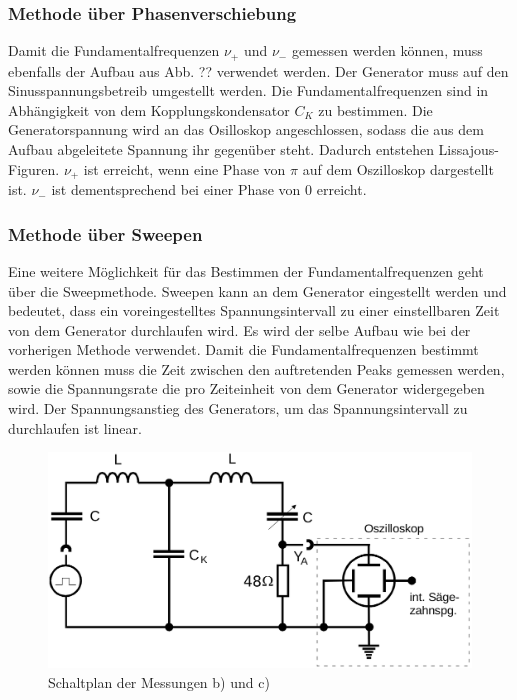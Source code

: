 \subsubsection{Methode über Phasenverschiebung}

Damit die Fundamentalfrequenzen $\nu_+$ und $\nu_-$ gemessen werden können, muss
ebenfalls der Aufbau aus Abb. ?? verwendet werden. Der Generator muss auf den
Sinusspannungsbetreib umgestellt werden. Die Fundamentalfrequenzen sind in Abhängigkeit
von dem Kopplungskondensator $C_K$ zu bestimmen. Die Generatorspannung wird an das
Osilloskop angeschlossen, sodass die aus dem Aufbau abgeleitete Spannung ihr
gegenüber steht. Dadurch entstehen Lissajous-Figuren. $\nu_+$ ist erreicht, wenn
eine Phase von $\pi$ auf dem Oszilloskop dargestellt ist. $\nu_-$ ist dementsprechend
bei einer Phase von $0$ erreicht.

\subsubsection{Methode über Sweepen}

Eine weitere Möglichkeit für das Bestimmen der Fundamentalfrequenzen geht über die
Sweepmethode.
Sweepen kann an dem Generator eingestellt werden und bedeutet, dass ein voreingestelltes
Spannungsintervall zu einer einstellbaren Zeit von dem Generator durchlaufen wird.
Es wird der selbe Aufbau wie bei der vorherigen Methode verwendet.
Damit die Fundamentalfrequenzen bestimmt werden können muss die Zeit zwischen den
auftretenden Peaks gemessen werden, sowie die Spannungsrate die pro Zeiteinheit
von dem Generator widergegeben wird. Der Spannungsanstieg des Generators, um das
Spannungsintervall zu durchlaufen ist linear.

\begin{figure}
  \includegraphics[width = \textwidth]{aufbau_schwebung.png}
  \caption{Schaltplan der Messungen b) und c)}
  \label{Schaltplan}
\end{figure}

\printbibliography


